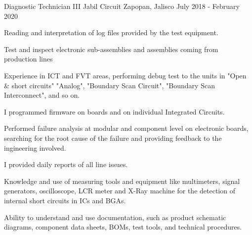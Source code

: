 


\begin{cventries}


\cventry
{Diagnostic Technician III} %
{Jabil Circuit} %
{Zapopan, Jalisco} %
{July 2018 - February 2020} %
{ %
\begin{cvitems}
\item {Reading and interpretation of log files provided by the test equipment.}
\item{Test and inspect electronic sub-assemblies and assemblies coming from production lines}
\item {Experience in ICT and FVT areas, performing debug test to the units in "Open \& short circuits" "Analog", "Boundary Scan Circuit", "Boundary Scan Interconnect", and so on.}
\item{I programmed firmware on boards and on individual Integrated Circuits.}
\item {Performed failure analysis at modular and component level on electronic boards, searching for the root cause of the failure and providing feedback to the ingineering involved.}
\item{I provided daily reports of all line issues.}	
\item{Knowledge and use of measuring tools and equipment like multimeters, signal generators, oscilloscope, LCR meter and X-Ray machine for the detection of internal short circuits in ICs and BGAs.}
\item{Ability to understand and use documentation, such as product schematic diagrams, component data sheets, BOMs, test tools, and technical procedures.}
\end{cvitems}
}


\end{cventries}
